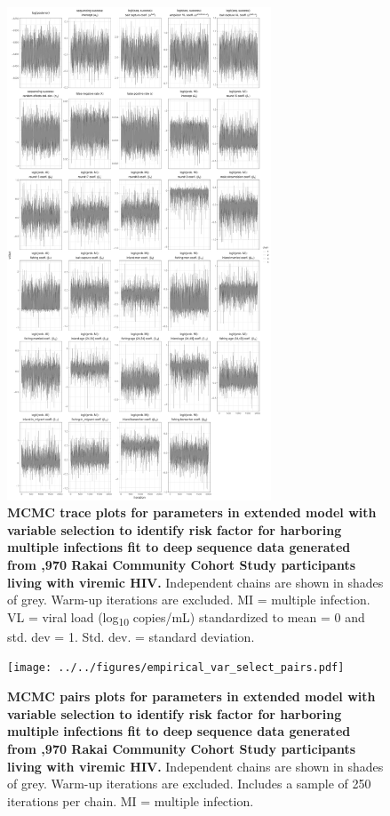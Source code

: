 \documentclass[10pt,letterpaper]{article}
\begin{document}
\begin{figure}[!ht]
 \includegraphics[width=0.7\textwidth]{../../figures/empirical_var_select_trace.pdf}
\caption{{\bf MCMC trace plots for parameters in extended model with variable selection to identify risk factor for harboring multiple infections fit to deep sequence data generated from ,970 Rakai Community Cohort Study participants living with viremic HIV.} Independent chains are shown in shades of grey. Warm-up iterations are excluded. MI = multiple infection. VL = viral load (log\textsubscript{10} copies/mL) standardized to mean = 0 and std. dev = 1. Std. dev. = standard deviation.}
\end{figure}

\begin{figure}[!ht]
 \texttt{[image: ../../figures/empirical\_var\_select\_pairs.pdf]}
\caption{{\bf MCMC pairs plots for parameters in extended model with variable selection to identify risk factor for harboring multiple infections fit to deep sequence data generated from ,970 Rakai Community Cohort Study participants living with viremic HIV.} Independent chains are shown in shades of grey. Warm-up iterations are excluded. Includes a sample of 250 iterations per chain. MI = multiple infection. }
\end{figure}
\end{document}
